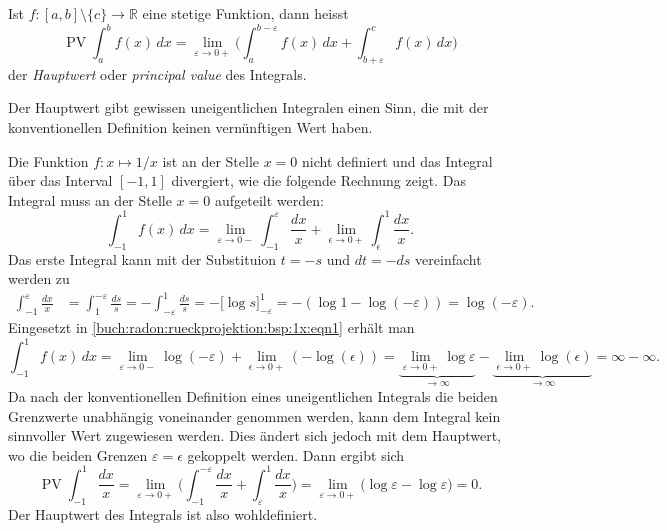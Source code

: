 \begin{definition}
Ist $f\colon[a,b]\setminus\{c\}\to\mathbb{R}$ eine stetige Funktion,
dann heisst
\[
\operatorname{PV}
\int_a^b f(x)\,dx
=
\lim_{\varepsilon\to 0+}
\biggl(
\int_a^{b-\varepsilon} f(x)\,dx
+
\int_{b+\varepsilon}^c f(x)\,dx
\biggr)
\]
der {\em Hauptwert} oder {\em principal value} des Integrals.
\end{definition}

Der Hauptwert gibt gewissen uneigentlichen Integralen einen Sinn, 
die mit der konventionellen Definition keinen vernünftigen Wert haben.

\begin{beispiel}
Die Funktion $f\colon x\mapsto 1/x$ ist an der Stelle $x=0$ nicht definiert und
das Integral über das Interval $[-1,1]$ divergiert, wie die folgende Rechnung
zeigt.
Das Integral muss an der Stelle $x=0$ aufgeteilt werden:
\begin{equation}
\int_{-1}^1 f(x)\,dx
=
\lim_{\varepsilon\to 0-}
\int_{-1}^{\varepsilon} \frac{dx}{x}
+
\lim_{\epsilon\to 0+}
\int_{\epsilon}^{1} \frac{dx}{x}.
\label{buch:radon:rueckprojektion:bsp:1x:eqn1}
\end{equation}
Das erste Integral kann mit der Substituion $t=-s$ und $dt=-ds$ vereinfacht
werden zu
\begin{align*}
\int_{-1}^{\varepsilon} \frac{dx}{x}
&=
\int_{1}^{-\varepsilon} \frac{ds}{s}
=
-
\int_{-\varepsilon}^1 \frac{ds}{s}
=
-
\biggl[
\log s
\biggr]_{-\varepsilon}^1
=
-
(
\log 1 - \log(-\varepsilon)
)
=
\log(-\varepsilon).
\end{align*}
Eingesetzt in 
\eqref{buch:radon:rueckprojektion:bsp:1x:eqn1}
erhält man
\[
\int_{-1}^1 f(x)\,dx
=
\lim_{\varepsilon\to 0-}
\log(-\varepsilon)
+
\lim_{\epsilon\to 0+}
(-\log(\epsilon))
=
\underbrace{
\lim_{\varepsilon\to 0+}
\log\varepsilon
}_{\displaystyle\to \infty}
-
\underbrace{
\lim_{\epsilon\to 0+}
\log(\epsilon)
}_{\displaystyle\to \infty}
=
\infty - \infty.
\]
Da nach der konventionellen Definition eines uneigentlichen
Integrals die beiden Grenzwerte unabhängig voneinander genommen werden,
kann dem Integral kein sinnvoller Wert zugewiesen werden.
Dies ändert sich jedoch mit dem Hauptwert, wo die beiden Grenzen
$\varepsilon=\epsilon$ gekoppelt werden.
Dann ergibt sich
\[
\operatorname{PV}
\int_{-1}^1 \frac{dx}{x}
=
\lim_{\varepsilon\to 0+}
\biggl(
\int_{-1}^{-\varepsilon}\frac{dx}{x}
+
\int_{\varepsilon}^{1} \frac{dx}{x}
\biggr)
=
\lim_{\varepsilon\to 0+}
\biggl(
\log\varepsilon - \log\varepsilon
\biggr)
=
0.
\]
Der Hauptwert des Integrals ist also wohldefiniert.
\end{beispiel}

